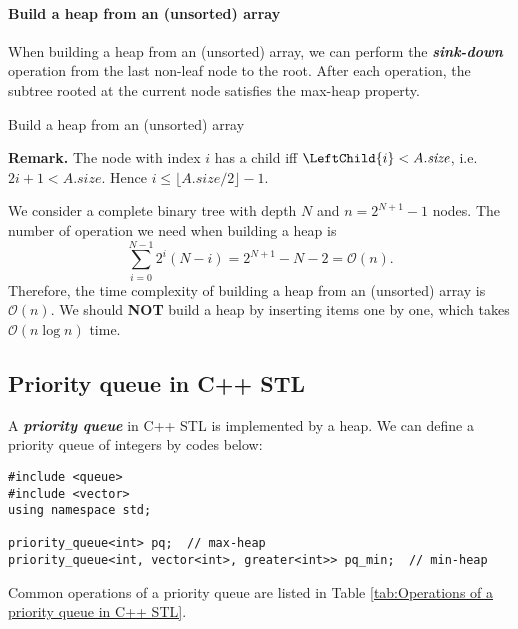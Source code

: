 \documentclass[12pt,a4paper]{ctexart}
\newcommand{\highlight}[1]{\textbf{\textit{#1}}}
\renewcommand{\leq}{\leqslant}
\begin{document}
    \paragraph{Build a heap from an (unsorted) array}

    When building a heap from an (unsorted) array, we can perform the \highlight{sink-down} operation from the last non-leaf node to the root. After each operation, the subtree rooted at the current node satisfies the max-heap property.

    \begin{algorithm}[!htbp]
        \caption{Build a heap from an (unsorted) array}
        \label{algo:Build a heap from an (unsorted) array}

    \end{algorithm}

    {\bf Remark. }The node with index $i$ has a child iff $\LeftChild{i} < A.\textit{size}$, i.e. $2i+1<A.\textit{size}$. Hence $i\leq\lfloor A.\textit{size}/2\rfloor-1$.

    We consider a complete binary tree with depth $N$ and $n=2^{N+1}-1$ nodes. The number of operation we need when building a heap is
    $$\sum_{i=0}^{N-1}2^i(N-i)=2^{N+1}-N-2=\mathcal O(n).$$
    Therefore, the time complexity of building a heap from an (unsorted) array is $\mathcal O(n)$. We should {\bf NOT} build a heap by inserting items one by one, which takes $\mathcal O(n\log n)$ time.

    \subsection{Priority queue in C++ STL}

    A \highlight{priority queue} in C++ STL is implemented by a heap. We can define a priority queue of integers by codes below:

    {\small
    \begin{lstlisting}
#include <queue>
#include <vector>
using namespace std;

priority_queue<int> pq;  // max-heap
priority_queue<int, vector<int>, greater<int>> pq_min;  // min-heap
    \end{lstlisting}}
    
    Common operations of a priority queue are listed in Table \ref{tab:Operations of a priority queue in C++ STL}.
\end{document}
